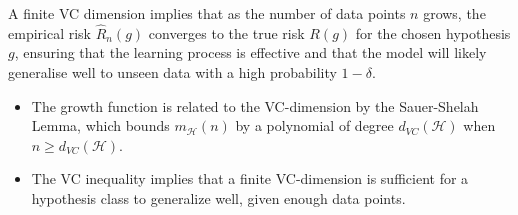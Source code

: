 A finite VC dimension implies that as the number of data points \( n \) grows, the empirical risk \( \widehat{R}_n(g) \) converges to the true risk \( R(g) \) for the chosen hypothesis \( g \), ensuring that the learning process is effective and that the model will likely generalise well to unseen data with a high probability \( 1 - \delta \).

\begin{itemize}
    \item The growth function is related to the VC-dimension by the Sauer-Shelah Lemma, which bounds $m_{\mathcal{H}}(n)$ by a polynomial of degree $d_{VC}(\mathcal{H})$ when $n \geq d_{VC}(\mathcal{H})$.
    \item The VC inequality implies that a finite VC-dimension is sufficient for a hypothesis class to generalize well, given enough data points.
\end{itemize}


